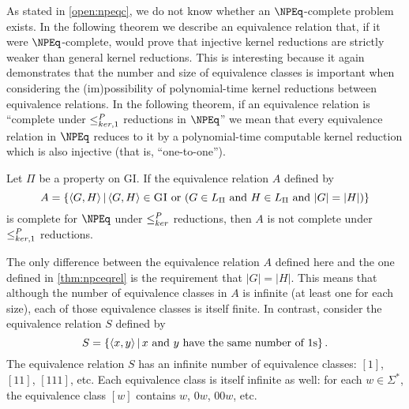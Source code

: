 As stated in \autoref{open:npeqc}, we do not know whether an $\NPEq$-complete problem exists.
In the following theorem we describe an equivalence relation that, if it were $\NPEq$-complete, would prove that injective kernel reductions are strictly weaker than general kernel reductions.
This is interesting because it again demonstrates that the number and size of equivalence classes is important when considering the (im)possibility of polynomial-time kernel reductions between equivalence relations.
In the following theorem, if an equivalence relation is ``complete under $\leq^{P}_{ker,1}$ reductions in $\NPEq$'' we mean that every equivalence relation in $\NPEq$ reduces to it by a polynomial-time computable kernel reduction which is also injective (that is, ``one-to-one'').

\begin{theorem}\label{thm:inj}
  Let $\Pi$ be a property on \textsc{GI}.
  If the equivalence relation $A$ defined by
  \begin{equation*}
    A = \left\{ \langle G,H\rangle \, \middle| \, \langle G,H\rangle \in \textsc{GI} \text{ or } (G \in L_\Pi \text{ and } H \in L_\Pi \text{ and } |G| = |H|) \right\}
  \end{equation*}
  is complete for $\NPEq$ under $\leq^{P}_{ker}$ reductions, then $A$ is not complete under $\leq^{P}_{ker,1}$ reductions.
\end{theorem}

The only difference between the equivalence relation $A$ defined here and the one defined in \autoref{thm:npceqrel} is the requirement that $|G| = |H|$.
This means that although the number of equivalence classes in $A$ is infinite (at least one for each size), each of those equivalence classes is itself finite.
In contrast, consider the equivalence relation $S$ defined by
\begin{equation*}\label{eq:ones}
  S = \left\{ \langle x,y\rangle \, \middle| \, x \text{ and } y \text{ have the same number of } 1 \text{s} \right\}.
\end{equation*}
The equivalence relation $S$ has an infinite number of equivalence classes: $[1]$, $[11]$, $[111]$, etc.
Each equivalence class is itself infinite as well: for each $w \in \Sigma^*$, the equivalence class $[w]$ contains $w$, $0w$, $00w$, etc.

